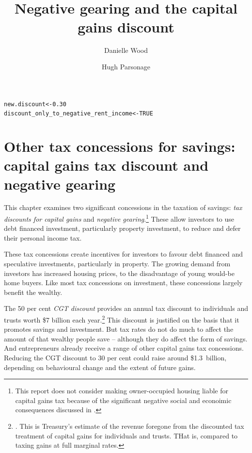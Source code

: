 \documentclass{grattan}\usepackage[]{graphicx}\usepackage[]{color}
\title{Negative gearing and the capital gains discount}
\author{Danielle Wood \and Hugh Parsonage}
\makeatletter
\newcommand{\hlnum}[1]{\textcolor[rgb]{0.686,0.059,0.569}{#1}}%
\newcommand{\hlstd}[1]{\textcolor[rgb]{0.345,0.345,0.345}{#1}}%
\newcommand{\hlkwb}[1]{\textcolor[rgb]{0.69,0.353,0.396}{#1}}%
\newenvironment{kframe}{%
 \def\at@end@of@kframe{}%
 \ifinner\ifhmode%
  \def\at@end@of@kframe{\end{minipage}}%
  \begin{minipage}{\columnwidth}%
 \fi\fi%
 \def\FrameCommand##1{\hskip\@totalleftmargin \hskip-\fboxsep
 \colorbox{shadecolor}{##1}\hskip-\fboxsep
     \hskip-\linewidth \hskip-\@totalleftmargin \hskip\columnwidth}%
 \MakeFramed {\advance\hsize-\width
   \@totalleftmargin\z@ \linewidth\hsize
   \@setminipage}}%
 {\par\unskip\endMakeFramed%
 \at@end@of@kframe}
\newenvironment{knitrout}{}{} %
\newcommand{\highlight}[1]{\emph{#1}}
\makeatother
\begin{document}
\clearpage


\raggedbottom
\contentspage
\listoffigures
\listoftables



\begin{knitrout}
\color{fgcolor}\begin{kframe}
\begin{alltt}
\hlstd{new.discount} \hlkwb{<-} \hlnum{0.30}
\hlstd{discount_only_to_negative_rent_income} \hlkwb{<-} \hlnum{TRUE}
\end{alltt}
\end{kframe}
\end{knitrout}










\chapter{Other tax concessions for savings: capital gains tax discount and negative gearing}
This chapter examines two significant concessions in the taxation of savings: \highlight{tax discounts for capital gains} and \highlight{negative gearing}.\footnote{This report does not consider making owner-occupied housing liable for capital gains tax because of the significant negative social and econoimic consequences discussed in \textcite[pp.~43-45]{Daley2013}.}  These allow investors to use debt financed investment, particularly property investment, to reduce and defer their personal income tax.

These tax concessions create incentives for investors to favour debt financed and speculative investments, particularly in property. The growing demand from investors has increased housing prices, to the disadvantage of young would-be home buyers. Like most tax concessions on investment, these concessions largely benefit the wealthy. 

The 50 per cent \highlight{CGT discount} provides an annual tax discount to individuals and trusts worth \$7 billion each year.\footnote{\textcite[p.4-21]{Treasury2015a}. This is Treasury's estimate of the revenue foregone from the discounted tax treatment of capital gains for individuals and trusts. THat is, compared to taxing gains at full marginal rates.} This discount is justified on the basis that it promotes savings and investment. But tax rates do not do much to affect the amount of that wealthy people save -- although they do affect the form of savings. And entrepreneurs already receive a range of other capital gains tax concessions. Reducing the CGT discount to 30 per cent could raise around \$1.3~billion, depending on behavioural change and the extent of future gains.
\end{document}
